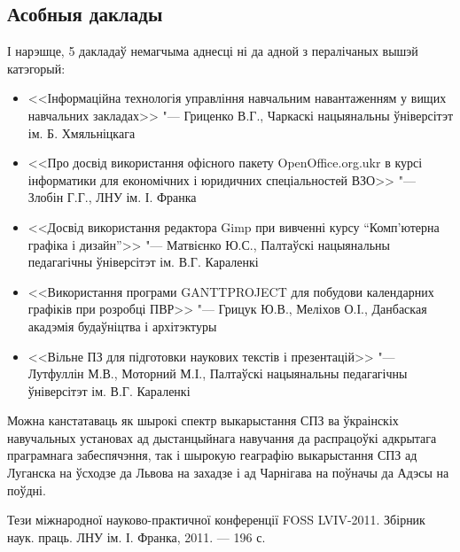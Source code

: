 \documentclass[10pt, a5paper]{article}
\begin{document}
\subsection*{Асобныя даклады}
І нарэшце, 5 дакладаў немагчыма аднесці ні да адной з пералічаных вышэй катэгорый:
\begin{itemize}
\item  <<Інформаційна технологія управління навчальним навантаженням у вищих навчальних закладах>> "--- Гриценко В.Г., Чаркаскі нацыянальны ўніверсітэт ім. Б. Хмяльніцкага
\item  <<Про досвід використання офісного  пакету OpenOffice.org.ukr в курсі інформатики для економічних і юридичних спеціальностей ВЗО>> "--- Злобін Г.Г., ЛНУ ім. І. Франка 
\item  <<Досвід використання  редактора Gimp при вивченні курсу “Комп'ютерна графіка і дизайн”>> "--- Матвієнко Ю.С., Палтаў\-скі нацыянальны педагагічны ўніверсітэт ім. В.Г. Караленкі
\item <<Використання програми GANTTPROJECT для побудови календарних графіків при розробці ПВР>> "--- Грицук Ю.В., Меліхов О.І., Данбаская акадэмія будаўніцтва і архітэктуры
\item <<Вільне ПЗ для підготовки наукових текстів і презентацій>> "--- Лутфуллін М.В., Моторний М.І., Палтаўскі нацыянальны педагагічны ўніверсітэт ім. В.Г. Караленкі
\end{itemize}

Можна канстатаваць як шырокі спектр выкарыстання СПЗ ва ўкраінскіх навучальных установах ад дыстанцыйнага навучання да распрацоўкі адкрытага праграмнага забеспячэння, так і шырокую геаграфію выкарыстання СПЗ ад Луганска на ўсходзе да Львова на захадзе і ад Чарнігава на поўначы да Адэсы на поўдні.

\begin{thebibliography}{9}
Тези міжнародної науково-практичної конференції FOSS LVIV-2011. Збірник наук. праць. ЛНУ ім. І. Франка, 2011. --- 196 с.
\end{thebibliography}
\end{document}
